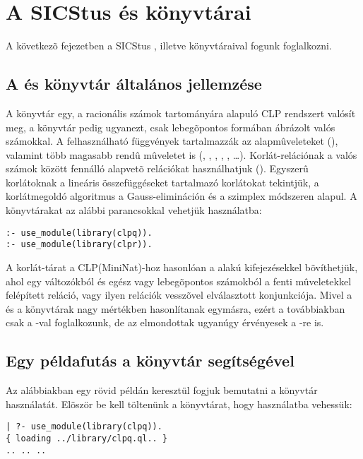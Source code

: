 \clearpage

\section{A SICStus \clpq és \clpr könyvtárai}

A következõ fejezetben a SICStus \clpq, illetve \clpr könyvtáraival
fogunk foglalkozni.

\subsection{A \clpq és \clpr könyvtár általános jellemzése}

A \clpq könyvtár egy, a racionális számok tartományára
alapuló CLP rendszert valósít meg, a \clpr könyvtár pedig ugyanezt, csak
lebegõpontos formában ábrázolt valós számokkal. A felhasználható függvények
tartalmazzák az alapmûveleteket (\cd{+ - * /}), valamint több magasabb rendû
mûveletet is (, , , , , \ldots).
Korlát-relációnak a valós számok között fennálló alapvetõ relációkat
használhatjuk (\cd{= =:= < > =< >= =\bs=}). Egyszerû korlátoknak a lineáris
összefüggéseket tartalmazó korlátokat tekintjük, a korlátmegoldó algoritmus
a Gauss-elimináción és a szimplex módszeren alapul. A könyvtárakat az alábbi
parancsokkal vehetjük használatba:

\begin{verbatim}
:- use_module(library(clpq)).
:- use_module(library(clpr)).
\end{verbatim}

A korlát-tárat a CLP(MiniNat)-hoz hasonlóan a  alakú
kifejezésekkel bõvíthetjük, ahol  egy változókból és egész vagy
lebegõpontos számokból a fenti mûveletekkel felépített reláció, vagy
ilyen relációk vesszõvel elválasztott konjunkciója.
\br
Mivel a \clpq és a \clpr könyvtárak nagy mértékben hasonlítanak
egymásra, ezért a továbbiakban csak a \Clpq-val foglalkozunk, de az
elmondottak ugyanúgy érvényesek a \Clpr-re is.

\subsection{Egy példafutás a \clpq könyvtár segítségével}

Az alábbiakban egy rövid példán keresztül fogjuk bemutatni a \clpq
könyvtár használatát.
\br
Elõször be kell töltenünk a \clpq könyvtárat, hogy használatba vehessük:

\begin{verbatim}
| ?- use_module(library(clpq)).
{ loading ../library/clpq.ql.. }
.. .. ..
\end{verbatim}

